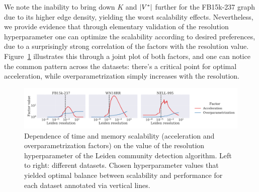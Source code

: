 We note the inability to bring down $K$ and $\mathopen{}\left|V^*\right|$ further for the FB15k-237 graph due to its higher edge density, yielding the worst scalability effects. Nevertheless, we provide evidence that through elementary validation of the resolution hyperparameter one can optimize the scalability according to desired preferences, due to a surprisingly strong correlation of the factors with the resolution value. Figure~\ref{fig:scalability_resolution} illustrates this through a joint plot of both factors, and one can notice the common pattern across the datasets: there's a critical point for optimal acceleration, while overparametrization simply increases with the resolution.

\begin{figure}[H]
\begin{center}
\includegraphics[width=\textwidth]{figures/coins/scalability_leiden_resolution}
\end{center}
\caption[Dependence of time and memory scalability on the value of the resolution hyperparameter of the Leiden community detection algorithm.]{Dependence of time and memory scalability (acceleration and overparametrization factors) on the value of the resolution hyperparameter of the Leiden community detection algorithm. Left to right: different datasets. Chosen hyperparameter values that yielded optimal balance between scalability and performance for each dataset annotated via vertical lines.}
\label{fig:scalability_resolution}
\end{figure}




